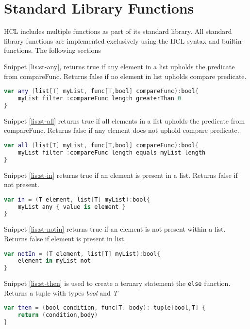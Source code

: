 \section{Standard Library Functions}
\label{standardLib}
HCL includes multiple functions as part of its standard library.
All standard library functions are implemented exclusively using the HCL syntax and builtin-functions. 
The following sections

Snippet \ref{lis:st-any}, returns true if any element in a list upholds the predicate from compareFunc. 
Returns false if no element in list upholds compare predicate.
\begin{lstlisting}[language=Kotlin,label=lis:st-any,caption=\texttt{any} function.]
var any (list[T] myList, func[T,bool] compareFunc):bool{
	myList filter :compareFunc length greaterThan 0
}
\end{lstlisting}

Snippet \ref{lis:st-all} returns true if all elements in a list upholds the predicate from compareFunc. 
Returns false if any element does not uphold compare predicate.
\begin{lstlisting}[language=Kotlin,label=lis:st-all,caption=\texttt{all} function.]
var all (list[T] myList, func[T,bool] compareFunc):bool{
	myList filter :compareFunc length equals myList length
}
\end{lstlisting}

Snippet \ref{lis:st-in} returns true if an element is present in a list. 
Returns false if not present. 
\begin{lstlisting}[language=Kotlin,label=lis:st-in,caption=\texttt{in} function.]
var in = (T element, list[T] myList):bool{
	myList any { value is element }
}
\end{lstlisting}

Snippet \ref{lis:st-notin} returns true if an element is not present within a list. 
Returns false if element is present in list. 
\begin{lstlisting}[language=Kotlin,label=lis:st-notin,caption=\texttt{notIn} function.]
var notIn = (T element, list[T] myList):bool{
	element in myList not
}
\end{lstlisting}

Snippet \ref{lis:st-then} is used to create a ternary statement the \texttt{else} function. 
Returns a tuple with types \textit{bool} and \textit{T}
\begin{lstlisting}[language=Kotlin,label=lis:st-then,caption=\texttt{then} function.]
var then = (bool condition, func[T] body): tuple[bool,T] {
	return (condition,body)
}
\end{lstlisting}

